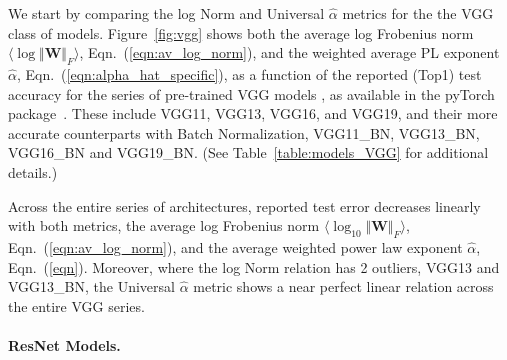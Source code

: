 We start by comparing the log Norm and Universal $\hat{\alpha}$ metrics for the  the VGG class of models.
Figure~\ref{fig:vgg} shows both the average log Frobenius norm
$\langle\log\Vert\mathbf{W}\Vert_{F}\rangle$,  Eqn.~(\ref{eqn:av_log_norm}),
and the weighted average PL exponent $\hat{\alpha}$,   Eqn.~(\ref{eqn:alpha_hat_specific}),
as a function of the reported (Top1) test accuracy for the series of pre-trained VGG models ,
as available in the pyTorch package~\cite{pyTorch}. 
These include VGG11, VGG13, VGG16, and VGG19, and
their more accurate counterparts with Batch Normalization, VGG11\_BN, VGG13\_BN, VGG16\_BN and VGG19\_BN.  
(See Table~\ref{table:models_VGG} for additional details.)

Across the entire series of architectures, reported test error decreases linearly with both metrics, the 
average log Frobenius norm $\langle\log_{10}\Vert\mathbf{W}\Vert_{F}\rangle$, Eqn.~(\ref{eqn:av_log_norm}), 
and the  average weighted power law exponent $\hat{\alpha}$,  Eqn.~(\ref{eqn}).
Moreover, where the log Norm relation has 2 outliers, VGG13 and VGG13\_BN, 
the Universal $\hat{\alpha}$ metric shows a near perfect linear relation across the entire VGG series.

\paragraph{ResNet Models.}

